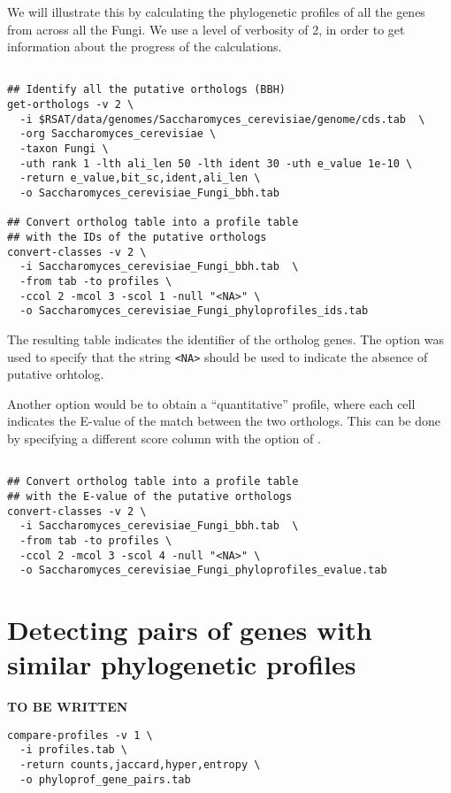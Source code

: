 We will illustrate this by calculating the phylogenetic profiles of
all the genes from  across all the
Fungi. We use a level of verbosity of 2, in order to get information
about the progress of the calculations.

\begin{small}
\begin{verbatim}

## Identify all the putative orthologs (BBH)
get-orthologs -v 2 \
  -i $RSAT/data/genomes/Saccharomyces_cerevisiae/genome/cds.tab  \
  -org Saccharomyces_cerevisiae \
  -taxon Fungi \
  -uth rank 1 -lth ali_len 50 -lth ident 30 -uth e_value 1e-10 \
  -return e_value,bit_sc,ident,ali_len \
  -o Saccharomyces_cerevisiae_Fungi_bbh.tab

## Convert ortholog table into a profile table
## with the IDs of the putative orthologs
convert-classes -v 2 \
  -i Saccharomyces_cerevisiae_Fungi_bbh.tab  \
  -from tab -to profiles \
  -ccol 2 -mcol 3 -scol 1 -null "<NA>" \
  -o Saccharomyces_cerevisiae_Fungi_phyloprofiles_ids.tab

\end{verbatim}
\end{small}


The resulting table indicates the identifier of the ortholog
genes. The option \option{-null} was used to specify that the string
\texttt{<NA>} should be used to indicate the absence of putative
orhtolog.

Another option would be to obtain a ``quantitative'' profile, where
each cell indicates the E-value of the match between the two
orthologs. This can be done by specifying a different score column
with the option  of .

\begin{small}
\begin{verbatim}

## Convert ortholog table into a profile table
## with the E-value of the putative orthologs
convert-classes -v 2 \
  -i Saccharomyces_cerevisiae_Fungi_bbh.tab  \
  -from tab -to profiles \
  -ccol 2 -mcol 3 -scol 4 -null "<NA>" \
  -o Saccharomyces_cerevisiae_Fungi_phyloprofiles_evalue.tab

\end{verbatim}
\end{small}

\section{Detecting pairs of genes with similar phylogenetic profiles}

\textbf{TO BE WRITTEN}


\begin{small}
\begin{verbatim}
compare-profiles -v 1 \
  -i profiles.tab \
  -return counts,jaccard,hyper,entropy \
  -o phyloprof_gene_pairs.tab
\end{verbatim}
\end{small}